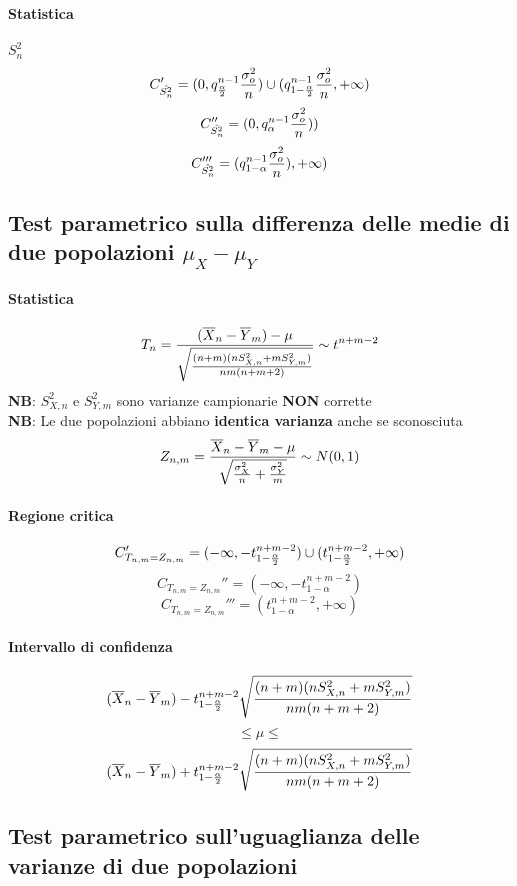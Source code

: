 \documentclass[12pt]{article}
\begin{document}
    \paragraph{Statistica} $S_n^2$
    $$C_{\hat{S_n^2}}' = (0, q_{\alpha \over 2}^{n-1}{\sigma_o^2 \over {n}}) \cup (q_{1-{\alpha \over 2}}^{n-1}{\sigma_o^2 \over {n}}, +\infty)$$
    $$C_{\hat{S_n^2}}'' = (0, q_\alpha^{n-1}{\sigma_o^2 \over {n}}))$$
    $$C_{\hat{S_n^2}}''' = (q_{1-\alpha}^{n-1}{\sigma_o^2 \over {n}}), +\infty)$$
    \newpage
    \subsection{Test parametrico sulla differenza delle medie di due popolazioni $\mu_X - \mu_Y$}
    \paragraph{Statistica} 
    $$T_n = {{(\overline{X}_n - \overline{Y}_m) - \mu} \over \sqrt{{(n+m)(nS_{X,n}^2+mS_{Y,m}^2)}\over{nm(n+m+2)}}} \sim t^{n+m-2}$$
    \textbf{NB}: $S^2_{X,n}$ e $S^2_{Y,m}$ sono varianze campionarie \textbf{NON} corrette
    \\\textbf{NB}: Le due popolazioni abbiano \textbf{identica varianza} anche se sconosciuta
    $$Z_{n,m} = {{\overline{X}_n - \overline{Y}_m - \mu}\over \sqrt{{\sigma_X^2 \over n}+{\sigma_Y^2 \over m}}} \sim N(0,1)$$
    \paragraph{Regione critica}
    $$C_{T_{n,m} = Z_{n, m}}' = (-\infty, -t^{n+m-2}_{1-{\alpha \over 2}}) \cup (t^{n+m-2}_{1-{\alpha \over 2}}, +\infty)$$
    $$C_{T_{n,m} = Z_{n, m}}'' = (-\infty, -t^{n+m-2}_{1-\alpha})$$
    $$C_{T_{n,m} = Z_{n, m}}''' = (t^{n+m-2}_{1-\alpha}, +\infty)$$
    \paragraph{Intervallo di confidenza}
    $$(\overline{X}_n - \overline{Y}_m) -t^{n+m-2}_{1-{\alpha \over 2}}\sqrt{{(n+m)(nS_{X,n}^2+mS_{Y,m}^2)}\over{nm(n+m+2)}}$$
    $$\leq \mu \leq$$ 
    $$ (\overline{X}_n - \overline{Y}_m) + t^{n+m-2}_{1-{\alpha \over 2}}\sqrt{{(n+m)(nS_{X,n}^2+mS_{Y,m}^2)}\over{nm(n+m+2)}}$$
    \newpage
    \subsection{Test parametrico sull'uguaglianza delle varianze di due popolazioni}
\end{document}
